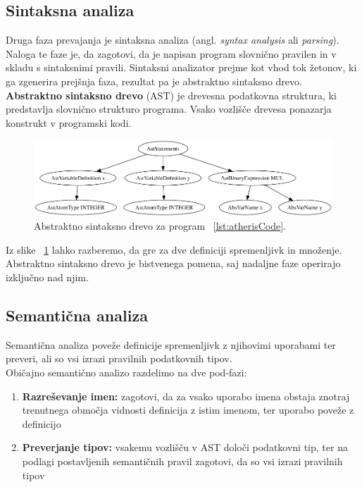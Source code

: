 \documentclass[a4paper, 12pt]{book}
\begin{document}
\subsection{Sintaksna analiza}

Druga faza prevajanja je sintaksna analiza (angl. \textit{syntax analysis} ali \textit{parsing}). Naloga te faze je, da zagotovi, da je napisan program slovnično pravilen in v skladu s sintaksnimi pravili. Sintaksni analizator prejme kot vhod tok žetonov, ki ga zgenerira prejšnja faza, rezultat pa je abstraktno sintaksno drevo.\\
\indent\textbf{Abstraktno sintaksno drevo} (AST) je drevesna podatkovna struktura, ki predstavlja slovnično strukturo programa. Vsako vozlišče drevesa ponazarja konstrukt v programski kodi.\\

\begin{figure}[h]
	\begin{center}
		\includegraphics[width=1\textwidth]{resources/ast.png}
	\end{center}
	\caption{Abstraktno sintaksno drevo za program ~\ref{lst:atherisCode}.}
	\label{image:ast}
\end{figure}

Iz slike ~\ref{image:ast} lahko razberemo, da gre za dve definiciji spremenljivk in množenje.\\
\indent Abstraktno sintaksno drevo je bistvenega pomena, saj nadaljne faze operirajo izključno nad njim.

\subsection{Semantična analiza}

Semantična analiza poveže definicije spremenljivk z njihovimi uporabami ter preveri, ali so vsi izrazi pravilnih podatkovnih tipov. \cite{modernCompiler}\\
\indent Običajno semantično analizo razdelimo na dve pod-fazi:
\begin{enumerate}
	\item \textbf{Razreševanje imen:} zagotovi, da za vsako uporabo imena obstaja znotraj trenutnega območja vidnosti definicija z istim imenom, ter uporabo poveže z definicijo
	\item \textbf{Preverjanje tipov:} vsakemu vozlišču v AST določi podatkovni tip, ter na podlagi postavljenih semantičnih pravil zagotovi, da so vsi izrazi pravilnih tipov
\end{enumerate}
\end{document}
